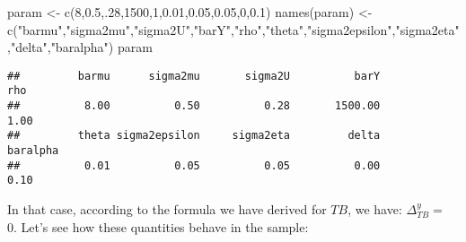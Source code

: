 \documentclass[
]{book}
\newenvironment{Shaded}{\begin{snugshade}}{\end{snugshade}}
\newcommand{\DecValTok}[1]{\textcolor[rgb]{0.00,0.00,0.81}{#1}}
\newcommand{\FloatTok}[1]{\textcolor[rgb]{0.00,0.00,0.81}{#1}}
\newcommand{\FunctionTok}[1]{\textcolor[rgb]{0.00,0.00,0.00}{#1}}
\newcommand{\NormalTok}[1]{#1}
\newcommand{\OtherTok}[1]{\textcolor[rgb]{0.56,0.35,0.01}{#1}}
\newcommand{\StringTok}[1]{\textcolor[rgb]{0.31,0.60,0.02}{#1}}
\theoremstyle{definition}
\theoremstyle{definition}
\theoremstyle{definition}
\theoremstyle{definition}
\theoremstyle{remark}
\begin{document}
\begin{Shaded}
\begin{Highlighting}[]
\NormalTok{param }\OtherTok{\textless{}{-}} \FunctionTok{c}\NormalTok{(}\DecValTok{8}\NormalTok{,}\FloatTok{0.5}\NormalTok{,.}\DecValTok{28}\NormalTok{,}\DecValTok{1500}\NormalTok{,}\DecValTok{1}\NormalTok{,}\FloatTok{0.01}\NormalTok{,}\FloatTok{0.05}\NormalTok{,}\FloatTok{0.05}\NormalTok{,}\DecValTok{0}\NormalTok{,}\FloatTok{0.1}\NormalTok{)}
\FunctionTok{names}\NormalTok{(param) }\OtherTok{\textless{}{-}} \FunctionTok{c}\NormalTok{(}\StringTok{"barmu"}\NormalTok{,}\StringTok{"sigma2mu"}\NormalTok{,}\StringTok{"sigma2U"}\NormalTok{,}\StringTok{"barY"}\NormalTok{,}\StringTok{"rho"}\NormalTok{,}\StringTok{"theta"}\NormalTok{,}\StringTok{"sigma2epsilon"}\NormalTok{,}\StringTok{"sigma2eta"}\NormalTok{,}\StringTok{"delta"}\NormalTok{,}\StringTok{"baralpha"}\NormalTok{)}
\NormalTok{param}
\end{Highlighting}
\end{Shaded}

\begin{verbatim}
##         barmu      sigma2mu       sigma2U          barY           rho 
##          8.00          0.50          0.28       1500.00          1.00 
##         theta sigma2epsilon     sigma2eta         delta      baralpha 
##          0.01          0.05          0.05          0.00          0.10
\end{verbatim}

In that case, according to the formula we have derived for \(TB\), we have: \(\Delta^y_{TB}=\) 0.
Let's see how these quantities behave in the sample:
\end{document}
